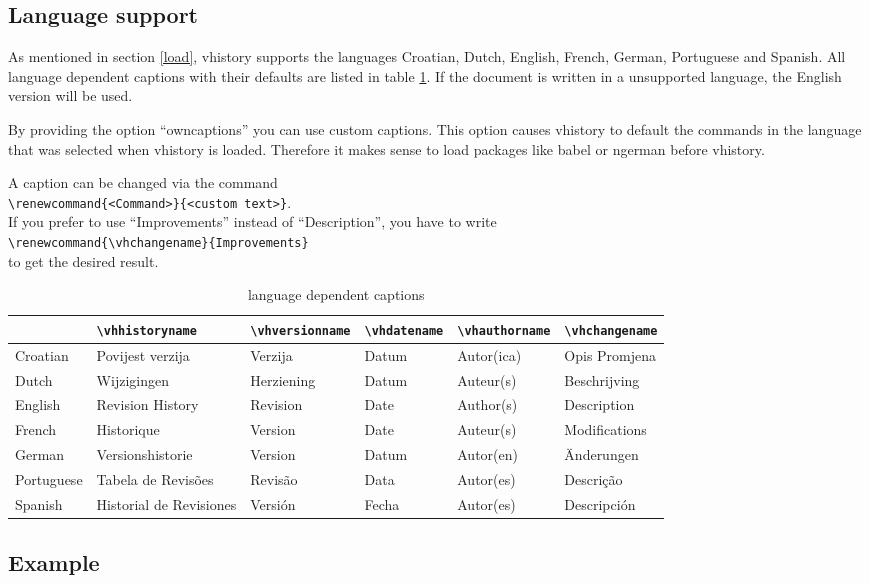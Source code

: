 \subsection{Language support}\label{languages}
As mentioned in section \ref{load}, vhistory supports the languages Croatian, Dutch, English, French, German, Portuguese and Spanish. All language dependent captions with their defaults are listed in table \ref{tab:languages}. If the document is written in a unsupported language, the English version will be used.

By providing the option ``owncaptions'' you can use custom captions. This option causes vhistory to default the commands in the language that was selected when vhistory is loaded. Therefore it makes sense to load packages like babel or ngerman before vhistory.

A caption can be changed via the command\\
\mbox{}\hspace{2em}\verb|\renewcommand{<Command>}{<custom text>}|.\\
If you prefer to use ``Improvements'' instead of ``Description'', you have to write\\
\mbox{}\hspace{2em}\verb|\renewcommand{\vhchangename}{Improvements}|\\
to get the desired result.

\begin{table}%
\begin{center}
\begin{scriptsize}
\begin{tabular}{llllll}\hline
& \verb|\vhhistoryname| & \verb|\vhversionname| & \verb|\vhdatename| & \verb|\vhauthorname| & \verb|\vhchangename|\\ \hline
Croatian & Povijest verzija & Verzija & Datum & Autor(ica) & Opis Promjena\\
Dutch & Wijzigingen & Herziening & Datum & Auteur(s) & Beschrijving\\
English & Revision History & Revision & Date & Author(s) & Description\\
French & Historique & Version & Date & Auteur(s) & Modifications\\
German & Versionshistorie & Version & Datum & Autor(en) & Änderungen\\
Portuguese & Tabela de Revis\~{o}es & Revis\~{a}o & Data & Autor(es) & Descri\c{c}\~{a}o\\
Spanish & Historial de Revisiones & Versi\'{o}n & Fecha & Autor(es) & Descripci\'{o}n\\  \hline
\end{tabular}
\end{scriptsize}
\caption{language dependent captions}
\label{tab:languages}
\end{center}
\end{table}

\subsection{Example}

